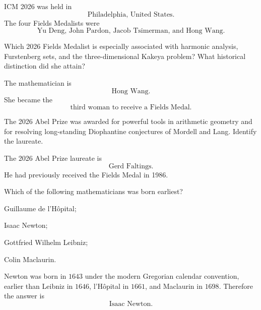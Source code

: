     \begin{solution}
        ICM 2026 was held in
        \[
            \boxed{\text{Philadelphia, United States}}.
        \]
        The four Fields Medalists were
        \[
            \boxed{
                \text{Yu Deng,\ John Pardon,\ Jacob Tsimerman,\ and Hong Wang}
            }.
        \]
    \end{solution}

    \begin{expectedproblem}
        Which 2026 Fields Medalist is especially associated with harmonic
        analysis, Furstenberg sets, and the three-dimensional Kakeya problem?
        What historical distinction did she attain?
    \end{expectedproblem}

    \begin{solution}
        The mathematician is
        \[
            \boxed{\text{Hong Wang}}.
        \]
        She became the
        \[
            \boxed{\text{third woman to receive a Fields Medal}}.
        \]
    \end{solution}

    \begin{expectedproblem}
        The 2026 Abel Prize was awarded for powerful tools in arithmetic
        geometry and for resolving long-standing Diophantine conjectures of
        Mordell and Lang. Identify the laureate.
    \end{expectedproblem}

    \begin{solution}
        The 2026 Abel Prize laureate is
        \[
            \boxed{\text{Gerd Faltings}}.
        \]
        He had previously received the Fields Medal in 1986.
    \end{solution}

    \begin{expectedproblem}
        Which of the following mathematicians was born earliest?
        \begin{problemchoices}
            \item Guillaume de l'H\^opital;
            \item Isaac Newton;
            \item Gottfried Wilhelm Leibniz;
            \item Colin Maclaurin.
        \end{problemchoices}
    \end{expectedproblem}

    \begin{solution}
        Newton was born in $1643$ under the modern Gregorian calendar
        convention, earlier than Leibniz in $1646$, l'H\^opital in $1661$, and
        Maclaurin in $1698$. Therefore the answer is
        \[
            \boxed{\text{Isaac Newton}}.
        \]
    \end{solution}

